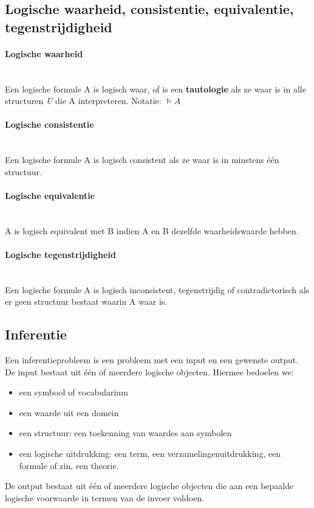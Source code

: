 \documentclass[11pt, a4paper]{article}
\begin{document}
\subsection*{Logische waarheid, consistentie, equivalentie, tegenstrijdigheid}
\paragraph{Logische waarheid}\hspace{0pt}\\
Een logische formule A is logisch waar, of is een \textbf{tautologie} als ze waar is in alle structuren \textit{U} die A interpreteren. Notatie: $\models A$
\paragraph{Logische consistentie}\hspace{0pt}\\
Een logische formule A is logisch consistent als ze waar is in minstens \'e\'en structuur.
\paragraph{Logische equivalentie}\hspace{0pt}\\
A is logisch equivalent met B indien A en B dezelfde waarheidswaarde hebben.
\paragraph{Logische tegenstrijdigheid}\hspace{0pt}\\
Een logische formule A is logisch inconsistent, tegenstrijdig of contradictorisch als er geen structuur bestaat waarin A waar is.

\subsection*{Inferentie}
Een inferentieprobleem is een probleem met een input en een gewenste output. De input bestaat uit \'e\'en of meerdere logische objecten. Hiermee bedoelen we:\begin{itemize}
\item een symbool of vocabularium
\item een waarde uit een domein
\item een structuur: een toekenning van waardes aan symbolen
\item een logische uitdrukking: een term, een verzamelingenuitdrukking, een formule of zin, een theorie.
\end{itemize}
De output bestaat uit \'e\'en of meerdere logische objecten die aan een bepaalde logische voorwaarde in termen van de invoer voldoen.
\end{document}
